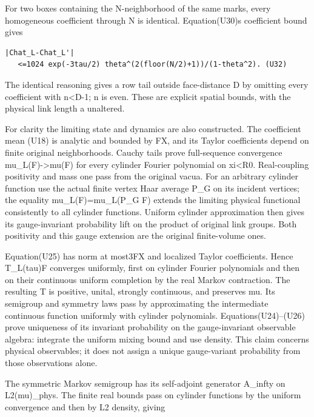 \documentclass[11pt,a4paper]{article}
\renewcommand{\[}{\begingroup\small\originaldisplaystart}
\renewcommand{\]}{\originaldisplayend\endgroup}
\begin{document}
For two boxes containing the N-neighborhood of the same marks, every
homogeneous coefficient through N is identical.
Equation(U30)\textquotesingle s coefficient bound gives

\begin{verbatim}
|Chat_L-Chat_L'|
   <=1024 exp(-3tau/2) theta^(2(floor(N/2)+1))/(1-theta^2). (U32)
\end{verbatim}

The identical reasoning gives a row tail outside face-distance D by
omitting every coefficient with n\textless D-1; n is even. These are
explicit spatial bounds, with the physical link length a unaltered.

For clarity the limiting state and dynamics are also constructed. The
coefficient mean (U18) is analytic and bounded by
\textbar\textbar F\textbar\textbar X, and its Taylor coefficients depend
on finite original neighborhoods. Cauchy tails prove full-sequence
convergence mu\_L(F)-\textgreater mu(F) for every cylinder Fourier
polynomial on \textbar xi\textbar\textless R0. Real-coupling positivity
and mass one pass from the original vacua. For an arbitrary cylinder
function use the actual finite vertex Haar average P\_G on its incident
vertices; the equality mu\_L(F)=mu\_L(P\_G F) extends the limiting
physical functional consistently to all cylinder functions. Uniform
cylinder approximation then gives its gauge-invariant probability lift
on the product of original link groups. Both positivity and this gauge
extension are the original finite-volume ones.

Equation(U25) has norm at most3\textbar\textbar F\textbar\textbar X and
localized Taylor coefficients. Hence T\_L(tau)F converges uniformly,
first on cylinder Fourier polynomials and then on their continuous
uniform completion by the real Markov contraction. The resulting T is
positive, unital, strongly continuous, and preserves mu. Its semigroup
and symmetry laws pass by approximating the intermediate continuous
function uniformly with cylinder polynomials. Equations(U24)--(U26)
prove uniqueness of its invariant probability on the gauge-invariant
observable algebra: integrate the uniform mixing bound and use density.
This claim concerns physical observables; it does not assign a unique
gauge-variant probability from those observations alone.

The symmetric Markov semigroup has its self-adjoint generator A\_infty
on L2(mu)\_phys. The finite real bounds pass on cylinder functions by
the uniform convergence and then by L2 density, giving
\end{document}
